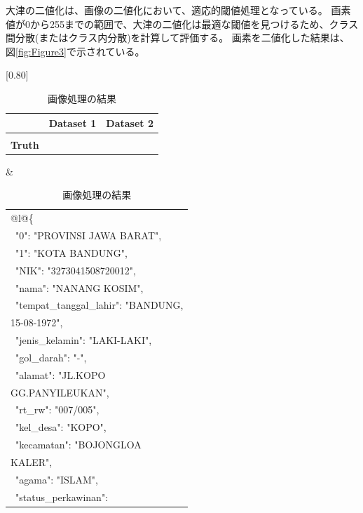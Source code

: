 \documentclass[uplatex, twocolumn,10pt]{jsarticle}
\begin{document}
大津の二値化は、画像の二値化において、適応的閾値処理となっている。
画素値が0から255までの範囲で、大津の二値化は最適な閾値を見つけるため、クラス間分散(またはクラス内分散)を計算して評価する。
画素を二値化した結果は、図\ref{fig:Figure3}で示されている。

\begin{table}[hbtp]
    \caption{画像処理の結果}
    \label{tb:Table1}
    \centering
    \small
    \scalebox{1.0}[0.80]{
        \begin{tabular}{|l|l|l|}
            \hline
                                           & \multicolumn{1}{c|}{\textbf{Dataset 1}} & \multicolumn{1}{c|}{\textbf{Dataset 2}} \\ 
            \hline
            \begin{tabular}[c]{@{}l@{}}\textbf{Ground}\\\textbf{Truth}\end{tabular}  & \begin{tabular}[c]{p{6cm}}{@{}l@{}}\{\\~"0": "PROVINSI JAWA BARAT", \\~"1": "KOTA BANDUNG",\\~"NIK": "3273041508720012", \\~"nama": "NANANG KOSIM", \\~"tempat\_tanggal\_lahir": "BANDUNG,\\15-08-1972",\\~"jenis\_kelamin": "LAKI-LAKI",\\~"gol\_darah": "-", \\~"alamat": "JL.KOPO\\GG.PANYILEUKAN", \\~"rt\_rw": "007/005", \\~"kel\_desa": "KOPO", \\~"kecamatan": "BOJONGLOA\\KALER", \\~"agama": "ISLAM",\\~"status\_perkawinan": 
\end{tabular}}
\end{table}
\end{document}
